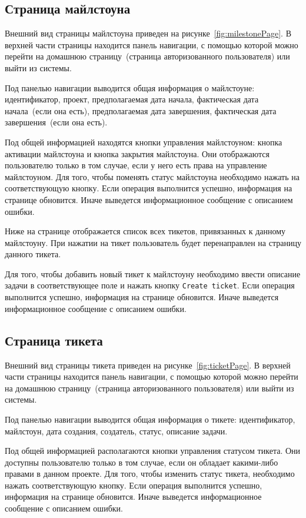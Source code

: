 \subsection{Страница майлстоуна}
Внешний вид страницы майлстоуна приведен на рисунке~\ref{fig:milestonePage}. В верхней части страницы находится панель навигации, с помощью которой можно перейти на домашнюю страницу~(страница авторизованного пользователя) или выйти из системы. 

Под панелью навигации выводится общая информация о майлстоуне: идентификатор, проект, предполагаемая дата начала, фактическая дата начала~(если она есть), предполагаемая дата завершения, фактическая дата завершения~(если она есть).

Под общей информацией находятся кнопки управления майлстоуном: кнопка активации майлстоуна и кнопка закрытия майлстоуна. Они отображаются пользователю только в том случае, если у него есть права на управление майлстоуном. Для того, чтобы поменять статус майлстоуна необходимо нажать на соответствующую кнопку. Если операция выполнится успешно, информация на странице обновится. Иначе выведется информационное сообщение с описанием ошибки.

Ниже на странице отображается список всех тикетов, привязанных к данному майлстоуну. При нажатии на тикет пользователь будет перенаправлен на страницу данного тикета.

Для того, чтобы добавить новый тикет к майлстоуну необходимо ввести описание задачи в соответствующее поле и нажать кнопку \texttt{Create ticket}. Если операция выполнится успешно, информация на странице обновится. Иначе выведется информационное сообщение с описанием ошибки.

\subsection{Страница тикета}
Внешний вид страницы тикета приведен на рисунке~\ref{fig:ticketPage}. В верхней части страницы находится панель навигации, с помощью которой можно перейти на домашнюю страницу~(страница авторизованного пользователя) или выйти из системы. 

Под панелью навигации выводится общая информация о тикете: идентификатор, майлстоун, дата создания, создатель, статус, описание задачи.

Под общей информацией располагаются кнопки управления статусом тикета. Они доступны пользователю только в том случае, если он обладает какими-либо правами в данном проекте. Для того, чтобы изменить статус тикета, необходимо нажать соответствующую кнопку. Если операция выполнится успешно, информация на странице обновится. Иначе выведется информационное сообщение с описанием ошибки.

